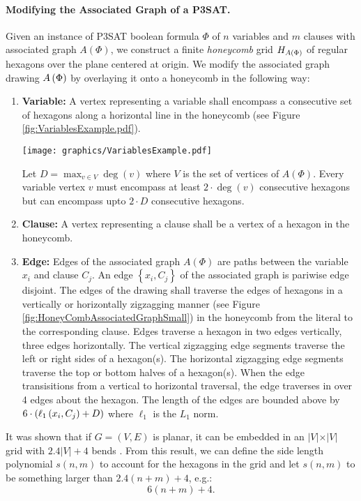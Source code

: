 \paragraph{Modifying the Associated Graph of a P3SAT.}

Given an instance of P3SAT boolean formula $\Phi$ of $n$ variables and $m$ clauses with associated graph $A(\Phi)$, we construct a finite \textit{honeycomb} grid $H_{A \left( \Phi \right)}$ of regular hexagons over the plane centered at origin.
We modify the associated graph drawing $A\left( \Phi \right)$ by overlaying it onto a honeycomb in the following way:

\begin{enumerate}
\item \textbf{Variable:} A vertex representing a variable shall encompass a consecutive set of hexagons along a horizontal line in the honeycomb (see Figure \ref{fig:VariablesExample.pdf}).

\begin{minipage}{\linewidth}
\begin{center}
\texttt{[image: graphics/VariablesExample.pdf]}
\label{fig:VariablesExample.pdf}
\end{center}
\end{minipage}

Let $D = \max_{v \in V} \deg(v)$ where $V$ is the set of vertices of $A(\Phi)$.
Every variable vertex $v$  must encompass at least $2 \cdot \deg(v)$ consecutive hexagons but can encompass upto $2 \cdot D$ consecutive hexagons.
\item \textbf{Clause:} A vertex representing a clause shall be a vertex of a hexagon in the honeycomb.
\item \textbf{Edge:} Edges of the associated graph $A(\Phi)$ are paths between the variable $x_i$ and clause $C_j$.  An edge $\left\lbrace x_i, C_j \right\rbrace$ of the associated graph is pariwise edge disjoint. 
The edges of the drawing shall traverse the edges of hexagons in a vertically or horizontally zigzagging manner (see Figure \ref{fig:HoneyCombAssociatedGraphSmall}) in the honeycomb from the literal to the corresponding clause. 
Edges traverse a hexagon in two edges vertically, three edges horizontally.  
The vertical zigzagging edge segments traverse the left or right sides of a hexagon(s).
The horizontal zigzagging edge segments traverse the top or bottom halves of a hexagon(s).
When the edge transisitions from a vertical to horizontal traversal, the edge traverses in over 4 edges about the hexagon.
The length of the edges are bounded above by $6 \cdot \left( \ell_1 \left( x_i,C_j \right) + D \right)$ where $\ell_1$ is the $L_1$ norm. 
\end{enumerate}
It was shown that if $G=(V,E)$ is planar, it can be embedded in an $\vert V \vert \times \vert V \vert$ grid with $2.4\vert V\vert + 4$ bends \cite{storer1984minimal,tamassia1987efficient}.
From this result, we can define the side length polynomial $s(n,m)$ to account for the hexagons in the grid and let $s(n,m)$ to be something larger than $2.4(n+m) + 4$, e.g.:
$$6 (n+m) + 4.$$


